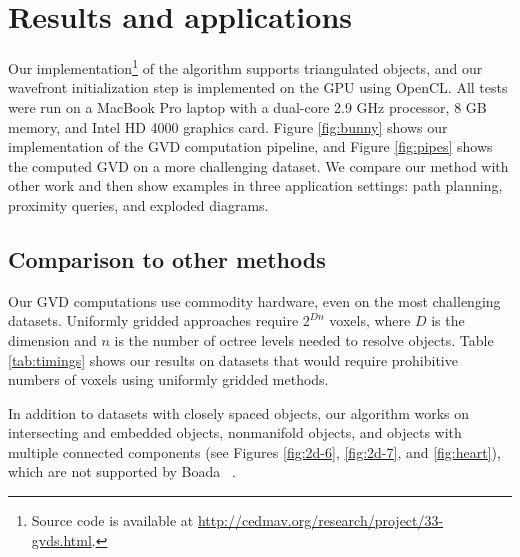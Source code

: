 \documentclass{egpubl}
\begin{document}
\section{Results and applications}
Our implementation\footnote{Source code is available at \url{http://cedmav.org/research/project/33-gvds.html}.} of the algorithm supports  triangulated objects, and our wavefront initialization step is implemented on the GPU using OpenCL. All tests were run on a MacBook Pro laptop with a dual-core 2.9 GHz processor, 8 GB memory, and Intel HD 4000 graphics card. Figure \ref{fig:bunny} shows our implementation of the GVD computation pipeline, and Figure \ref{fig:pipes} shows the computed GVD on a more challenging dataset.  We compare our method with other work and then show examples in three application settings: path planning, proximity queries, and exploded diagrams.

\subsection{Comparison to other methods}

Our GVD computations use commodity hardware, even on the most challenging datasets.  Uniformly gridded approaches \cite{cao2010parallel,fischer2006fast,hsieh2005simple,rong2007variants,sud2006interactive,sud2006fast,hoff1999fast,wu2008gpu,yin2011fast} require $2^{Dn}$ voxels, where $D$ is the dimension and $n$ is the number of octree levels needed to resolve objects.  Table \ref{tab:timings} shows our results on datasets that would require prohibitive numbers of voxels using uniformly gridded methods.%

In addition to datasets with closely spaced objects, our algorithm works on intersecting and embedded objects, nonmanifold objects, and objects with multiple connected components (see Figures \ref{fig:2d-6}, \ref{fig:2d-7}, and \ref{fig:heart}), which are not supported by Boada \etal~.

\end{document}
